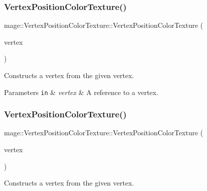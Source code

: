 \subsubsection{\texorpdfstring{Vertex\+Position\+Color\+Texture()}{VertexPositionColorTexture()}\hspace{0.1cm}{\footnotesize\ttfamily [3/4]}}
{\footnotesize\ttfamily mage\+::\+Vertex\+Position\+Color\+Texture\+::\+Vertex\+Position\+Color\+Texture (\begin{DoxyParamCaption}\item[{const \hyperlink{structmage_1_1_vertex_position_color_texture}{Vertex\+Position\+Color\+Texture} \&}]{vertex }\end{DoxyParamCaption})\hspace{0.3cm}{\ttfamily [default]}}

Constructs a vertex from the given vertex.


\begin{DoxyParams}[1]{Parameters}
\mbox{\tt in}  & {\em vertex} & A reference to a vertex. \\
\hline
\end{DoxyParams}
\hypertarget{structmage_1_1_vertex_position_color_texture_ad3dcf3020023261216437b6315f29261}{}\label{structmage_1_1_vertex_position_color_texture_ad3dcf3020023261216437b6315f29261} 
\subsubsection{\texorpdfstring{Vertex\+Position\+Color\+Texture()}{VertexPositionColorTexture()}\hspace{0.1cm}{\footnotesize\ttfamily [4/4]}}
{\footnotesize\ttfamily mage\+::\+Vertex\+Position\+Color\+Texture\+::\+Vertex\+Position\+Color\+Texture (\begin{DoxyParamCaption}\item[{\hyperlink{structmage_1_1_vertex_position_color_texture}{Vertex\+Position\+Color\+Texture} \&\&}]{vertex }\end{DoxyParamCaption})\hspace{0.3cm}{\ttfamily [default]}}

Constructs a vertex from the given vertex.


